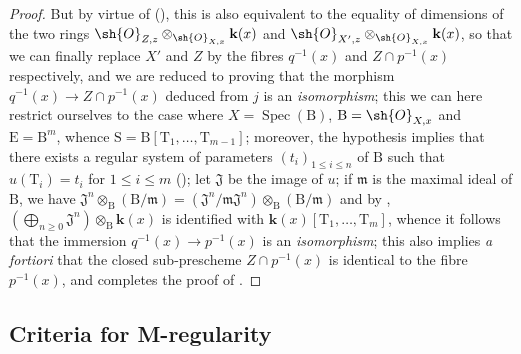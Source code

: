 \begin{proof}
But by virtue of (), this is also equivalent to the equality of dimensions of the two rings $\sh{O}_{Z,z}\otimes_{\sh{O}_{X,x}}\mathbf{k}(x)$ and $\sh{O}_{X',z}\otimes_{\sh{O}_{X,x}}\mathbf{k}(x)$, so that we can finally replace $X'$ and $Z$ by the fibres $q^{-1}(x)$ and $Z\cap p^{-1}(x)$ respectively, and we are reduced to proving that the morphism $q^{-1}(x)\to Z\cap p^{-1}(x)$ deduced from $j$ is an \emph{isomorphism}; this we can here restrict ourselves to the case where $X=\operatorname{Spec}(\mathrm{B})$, $\mathrm{B}=\sh{O}_{X,x}$ and $\mathrm{E}=\mathrm{B}^m$, whence $\mathrm{S}=\mathrm{B}[\mathrm{T}_1,\ldots,\mathrm{T}_{m-1}]$; moreover, the hypothesis implies that there exists a regular system of parameters $(t_i)_{1\leq i\leq n}$ of $\mathrm{B}$ such that $u(\mathrm{T}_i)=t_i$ for $1\leq i\leq m$ (); let $\mathfrak{J}$ be the image of $u$; if $\mathfrak{m}$ is the maximal ideal of $\mathrm{B}$, we have $\mathfrak{J}^n\otimes_{\mathrm{B}}(\mathrm{B}/\mathfrak{m})=(\mathfrak{J}^n/\mathfrak{m}\mathfrak{J}^n)\otimes_\mathrm{B}(\mathrm{B}/\mathfrak{m})$ and by , $(\bigoplus_{n\geq 0}\mathfrak{J}^n)\otimes_{\mathrm{B}}\mathbf{k}(x)$ is identified with $\mathbf{k}(x)[\mathrm{T}_1,\ldots,\mathrm{T}_m]$, whence it follows that the immersion $q^{-1}(x)\to p^{-1}(x)$ is an \emph{isomorphism}; this also implies \emph{a fortiori} that the closed sub-prescheme $Z\cap p^{-1}(x)$ is identical to the fibre $p^{-1}(x)$, and completes the proof of .
\end{proof}

\subsection{Criteria for M-regularity}
\label{subsection:IV.19.5}


